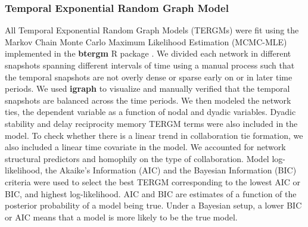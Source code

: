 \subsubsection{Temporal Exponential Random Graph Model}
\label{sec:methods_tergm}
All Temporal Exponential Random Graph Models (TERGMs) were fit using the Markov Chain Monte Carlo Maximum Likelihood Estimation (MCMC-MLE) implemented in the \textbf{btergm} R package \cite{leifeld_temporal_2015}. 
We divided each network in different snapshots spanning different intervals of time using a manual process such that the temporal snapshots are not overly dense or sparse early on or in later time periods. We used \textbf{igraph} to visualize and manually verified that the temporal snapshots are balanced across the time periods. We then modeled the network ties, the dependent variable as a function of nodal and dyadic variables. Dyadic stability and delay reciprocity memory TERGM terms were also included in the model. To check whether there is a linear trend in collaboration tie formation, we also included a linear time covariate in the model. We accounted for network structural predictors and homophily on the type of collaboration.  Model log-likelihood, the Akaike's Information (AIC) and the Bayesian Information (BIC) criteria were used to select the best TERGM corresponding to the lowest AIC or BIC, and highest log-likelihood. AIC and BIC are estimates of a function of the posterior probability of a model being true. Under a Bayesian setup, a lower BIC or AIC means that a model is more likely to be the true model.  \\
